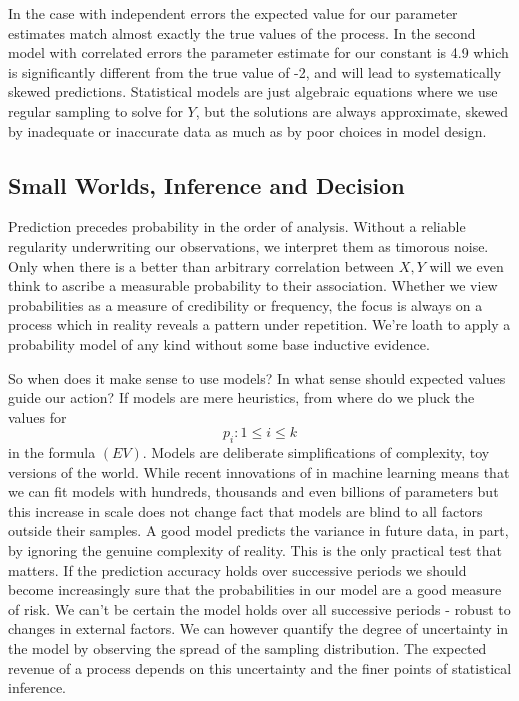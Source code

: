 \documentclass[10pt,a4paper,notitlepage, twocolumn]{article}
\begin{document}
In the case with independent errors the expected value for our parameter estimates match almost exactly the true values of the process. In the second model with correlated errors the parameter estimate for our constant is 4.9 which is significantly different from the true value of -2, and will lead to systematically skewed predictions. Statistical models are just algebraic equations where we use regular sampling to solve for $Y$, but the solutions are always approximate, skewed by inadequate or inaccurate data as much as by poor choices in model design. 

\subsection*{Small Worlds, Inference and Decision}
Prediction precedes probability in the order of analysis. Without a reliable regularity underwriting our observations, we interpret them as timorous noise. Only when there is a better than arbitrary correlation between $X, Y$ will we even think to ascribe a measurable probability to their association. Whether we view probabilities as a measure of credibility or frequency, the focus is always on a process which in reality reveals a pattern under repetition. We're loath to apply a probability model of any kind without some base inductive evidence.
\newline 

\noindent So when does it make sense to use models? In what sense should expected values guide our action? If models are mere heuristics, from where do we pluck the values for $$p_{i} : 1 \leq i \leq k$$ in the formula $(EV)$. Models are deliberate simplifications of complexity, toy versions of the world. While recent innovations of in machine learning means that we can fit models with hundreds, thousands and even billions of parameters but this increase in scale does not change fact that models are blind to all factors outside their samples. A good model predicts the variance in future data, in part, by ignoring the genuine complexity of reality. This is the only practical test that matters. If the prediction accuracy holds over successive periods we should become increasingly sure that the probabilities in our model are a good measure of risk. We can't be certain the model holds over all successive periods - robust to changes in external factors. We can however quantify the degree of uncertainty in the model by observing the spread of the sampling distribution. The expected revenue of a process depends on this uncertainty and the finer points of statistical inference. 
\end{document}
